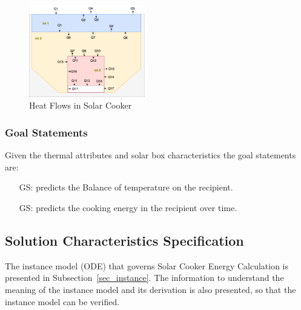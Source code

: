\documentclass[12pt]{article}
\newcounter{goalnum} %
\begin{document}
\begin{figure}[h!]
\begin{center}
\includegraphics[width=0.45\textwidth]{HeatFlow}
\caption{Heat Flows in Solar Cooker}
\label{Fig_HeatFlows} 
\end{center}
\end{figure}



\subsubsection{Goal Statements}

\noindent Given the thermal attributes and solar box characteristics the goal statements are:

\begin{itemize}

\item[GS\refstepcounter{goalnum}\thegoalnum \label{G_meaningfulLabel}:] predicts the Balance of temperature on the recipient.

\item[GS\refstepcounter{goalnum}\thegoalnum \label{G_meaningfulLabel}:] predicts the cooking energy in the recipient over time.

\end{itemize}

\subsection{Solution Characteristics Specification}

The instance model (ODE) that governs Solar Cooker
Energy Calculation is presented in
Subsection~\ref{sec_instance}.  The information to understand the meaning of the
instance model and its derivation is also presented, so that the instance
model can be verified.
\end{document}
